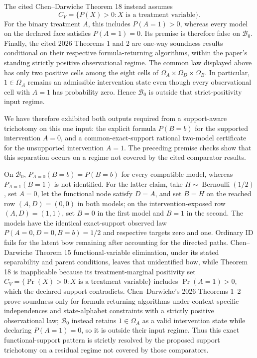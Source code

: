 The cited Chen--Darwiche Theorem 18 instead assumes
\[
 C_V=\{P(X)>0:X\text{ is a treatment variable}\}.
\]
For the binary treatment \(A\), this includes \(P(A=1)>0\), whereas every model on the declared face satisfies \(P(A=1)=0\).  Its premise is therefore false on \(\mathcal B_0\).  Finally, the cited 2026 Theorems 1 and 2 are one-way soundness results conditional on their respective formula-returning algorithms, within the paper's standing strictly positive observational regime.  The common law displayed above has only two positive cells among the eight cells of \(\Omega_A\times\Omega_D\times\Omega_B\).  In particular, \(1\in\Omega_A\) remains an admissible intervention state even though every observational cell with \(A=1\) has probability zero.  Hence \(\mathcal B_0\) is outside that strict-positivity input regime.

We have therefore exhibited both outputs required from a support-aware trichotomy on this one input: the explicit formula \(P(B=b)\) for the supported intervention \(A=0\), and a common-exact-support rational two-model certificate for the unsupported intervention \(A=1\).  The preceding premise checks show that this separation occurs on a regime not covered by the cited comparator results.

On \(\mathcal B_0\), \(P_{A=0}(B=b)=P(B=b)\) for every compatible model, whereas \(P_{A=1}(B=1)\) is not identified. For the latter claim, take \(H\sim\operatorname{Bernoulli}(1/2)\), set \(A=0\), let the functional node satisfy \(D=A\), and set \(B=H\) on the reached row \((A,D)=(0,0)\) in both models; on the intervention-exposed row \((A,D)=(1,1)\), set \(B=0\) in the first model and \(B=1\) in the second. The models have the identical exact-support observed law \(P(A=0,D=0,B=b)=1/2\) and respective targets zero and one. Ordinary ID fails for the latent bow remaining after accounting for the directed paths. Chen--Darwiche Theorem 15 functional-variable elimination, under its stated separability and parent conditions, leaves that unidentified bow, while Theorem 18 is inapplicable because its treatment-marginal positivity set \(C_V=\{\Pr(X)>0:X\text{ is a treatment variable}\}\) includes \(\Pr(A=1)>0\), which the declared support contradicts. Chen--Darwiche's 2026 Theorems 1--2 prove soundness only for formula-returning algorithms under context-specific independences and state-alphabet constraints with a strictly positive observational law; \(\mathcal B_0\) instead retains \(1\in\Omega_A\) as a valid intervention state while declaring \(P(A=1)=0\), so it is outside their input regime. Thus this exact functional-support pattern is strictly resolved by the proposed support trichotomy on a residual regime not covered by those comparators.

